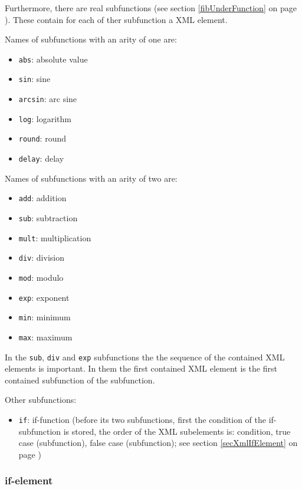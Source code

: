 \bigskip\noindent
Furthermore, there are real subfunctions (see section \ref{fibUnderFunction} on page \pageref{fibUnderFunction}). These contain for each of ther subfunction a XML element.

\bigskip\noindent
Names of subfunctions with an arity of one are:
\begin{itemize}
 \item \verb|abs|: absolute value
 \item \verb|sin|: sine
 \item \verb|arcsin|: arc sine
 \item \verb|log|: logarithm
 \item \verb|round|: round
 \item \verb|delay|: delay
\end{itemize}

\bigskip\noindent
Names of subfunctions with an arity of two are:
\begin{itemize}
 \item \verb|add|: addition
 \item \verb|sub|: subtraction
 \item \verb|mult|: multiplication
 \item \verb|div|: division
 \item \verb|mod|: modulo
 \item \verb|exp|: exponent
 \item \verb|min|: minimum
 \item \verb|max|: maximum
\end{itemize}
In the \verb|sub|, \verb|div| and \verb|exp| subfunctions the the sequence of the contained XML elements is important. In them the first contained XML element is the first contained subfunction of the subfunction.

\bigskip\noindent
Other subfunctions:
\begin{itemize}
 \item \verb|if|: if-function (before its two subfunctions, first the condition of the if-subfunction is stored, the order of the XML subelements is: condition, true case (subfunction), false case (subfunction); see section \ref{secXmlIfElement} on page \pageref{secXmlIfElement})
\end{itemize}



\subsubsection{if-element}
\label{secXmlIfElement}

